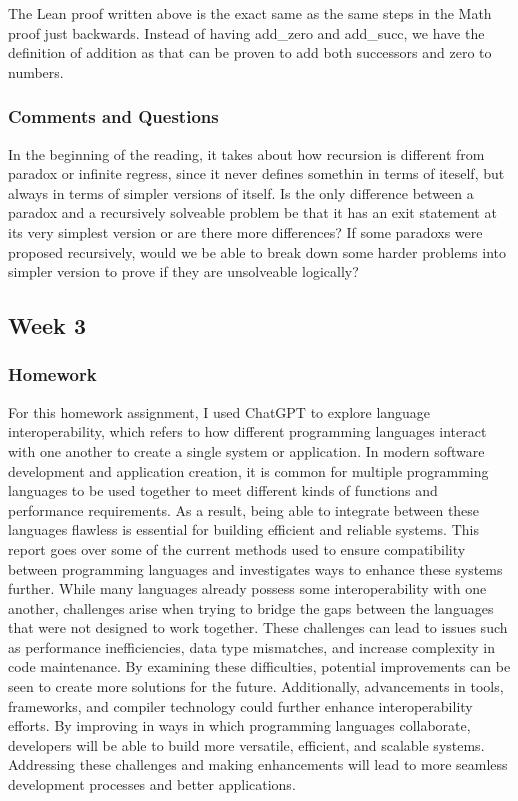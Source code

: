 \documentclass{article}
\theoremstyle{theorem}
\theoremstyle{definition}
\theoremstyle{remark}
\begin{document}
The Lean proof written above is the exact same as the same steps in the Math proof just backwards. 
Instead of having add\_zero and add\_succ, we have the definition of addition as that can be proven to add both 
successors and zero to numbers.  

\subsubsection{Comments and Questions}

In the beginning of the reading, it takes about how recursion is different from paradox or infinite regress, since it  never defines somethin in terms of iteself, but always in terms of simpler versions of itself. Is the only difference between a paradox and a recursively solveable problem be that it has an exit statement at its very simplest version or are there more differences? If some paradoxs were proposed recursively, would we be able to break down some harder problems into simpler version to prove if they are unsolveable logically?

\subsection{Week 3}

\subsubsection{Homework}

For this homework assignment, I used ChatGPT to explore language interoperability, which refers to how different programming languages interact with one another to create a single system or application. In modern software development and application creation, it is common for multiple programming languages to be used together to meet different kinds of functions and performance requirements. As a result, being able to integrate between these languages flawless is essential for building efficient  and reliable systems. This report goes over some of the current methods used to ensure compatibility between programming languages and investigates ways to enhance these systems further. While many languages already possess some interoperability with one another, challenges arise when trying to bridge the gaps between the languages that were not designed to work together. These challenges can lead to issues such as performance inefficiencies, data type mismatches, and increase complexity in code maintenance. By examining these difficulties, potential improvements can be seen to create more solutions for the future. Additionally, advancements in tools, frameworks, and compiler technology could further enhance interoperability efforts. By improving in ways in which programming languages collaborate, developers will be able to build more versatile, efficient, and scalable systems. Addressing these challenges and making enhancements will lead to more seamless development processes and better applications.  
\end{document}
